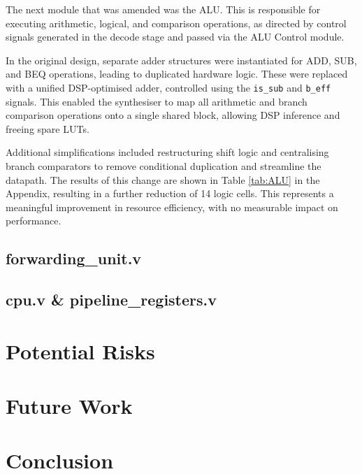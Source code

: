 \documentclass[a4paper,10pt]{article}
\begin{document}
The next module that was amended was the ALU. 
This is responsible for executing arithmetic, logical, 
and comparison operations, as directed by control signals 
generated in the decode stage and passed via the ALU Control module.

In the original design, separate adder structures were instantiated for 
ADD, SUB, and BEQ operations, leading to duplicated hardware logic. 
These were replaced with a unified DSP-optimised adder, controlled using the 
\texttt{is\_sub} and \texttt{b\_eff} signals. 
This enabled the synthesiser to map all arithmetic and 
branch comparison operations onto a single shared block, 
allowing DSP inference and freeing spare LUTs.

Additional simplifications included restructuring shift logic 
and centralising branch comparators to remove conditional duplication 
and streamline the datapath. 
The results of this change are shown in 
Table \ref{tab:ALU} in the Appendix, 
resulting in a further reduction of 14 logic cells. 
This represents a meaningful improvement in resource efficiency, 
with no measurable impact on performance.

\subsection{forwarding\_unit.v}
\label{sec:forwarding_unit.v}

\subsection{cpu.v \& pipeline\_registers.v}
\label{sec:cpu.v_and_pipeline_registers.v}

\section{Potential Risks}
\label{sec:Potential_Risks}

\section{Future Work}
\label{sec:Future_Work}

\section{Conclusion}
\label{sec:Conclusion}
\end{document}
